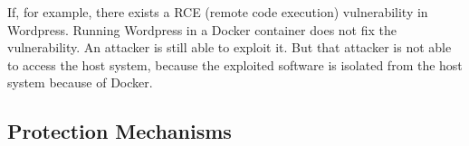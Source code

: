 If, for example, there exists a RCE (remote code execution) vulnerability in Wordpress. Running Wordpress in a Docker container does not fix the vulnerability. An attacker is still able to exploit it. But that attacker is not able to access the host system, because the exploited software is isolated from the host system because of Docker.

\subsection{Protection Mechanisms}
